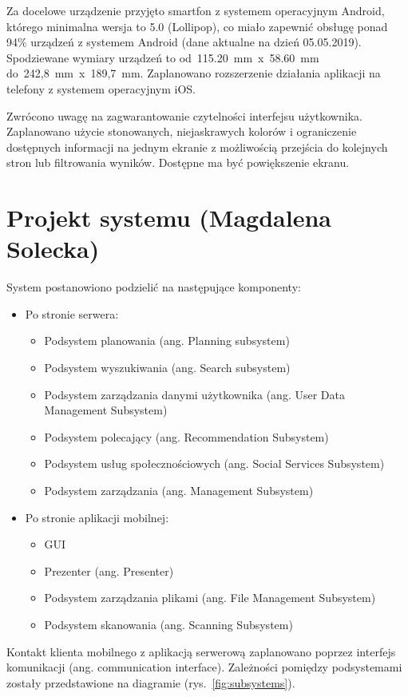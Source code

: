 \documentclass[10pt,twoside,a4paper]{report}
\begin{document}
\par Za docelowe urządzenie przyjęto smartfon z systemem operacyjnym Android, którego minimalna wersja to 5.0 (Lollipop), co miało zapewnić obsługę ponad 94\% urządzeń z systemem Android (dane aktualne na dzień 05.05.2019\cite{Android usage}). Spodziewane wymiary urządzeń to od~115.20~mm~x~58.60~mm do~242,8~mm~x~189,7~mm. Zaplanowano rozszerzenie działania aplikacji na telefony z systemem operacyjnym iOS.

\par Zwrócono uwagę na zagwarantowanie czytelności interfejsu użytkownika. Zaplanowano użycie stonowanych, niejaskrawych kolorów i ograniczenie dostępnych informacji na jednym ekranie z możliwością przejścia do kolejnych stron lub filtrowania wyników. Dostępne ma być powiększenie ekranu.

\chapter{Projekt systemu (Magdalena Solecka)}
\par System postanowiono podzielić na następujące komponenty:
\begin{itemize}
\item Po stronie serwera:
\begin{itemize}
\item Podsystem planowania (ang. Planning subsystem)
\item Podsystem wyszukiwania (ang. Search subsystem)
\item Podsystem zarządzania danymi użytkownika (ang. User Data Management Subsystem)
\item Podsystem polecający (ang. Recommendation Subsystem)
\item Podsystem usług społecznościowych (ang. Social Services Subsystem)
\item Podsystem zarządzania (ang. Management Subsystem)
\end{itemize}
\item Po stronie aplikacji mobilnej:
\begin{itemize}
\item GUI
\item Prezenter (ang. Presenter)
\item Podsystem zarządzania plikami (ang. File Management Subsystem)
\item Podsystem skanowania (ang. Scanning Subsystem)
\end{itemize}
\end{itemize}
\par Kontakt klienta mobilnego z aplikacją serwerową zaplanowano poprzez interfejs komunikacji (ang. communication interface). Zależności pomiędzy podsystemami zostały przedstawione na diagramie (rys.~\ref{fig:subsystems}).
\end{document}
